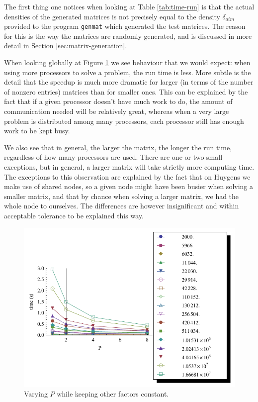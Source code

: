 \documentclass[a4paper]{article}
\newcommand{\legendplotsize}{1.3\textwidth}
\begin{document}
The first thing one notices when looking at Table \ref{tab:time-run} is that the actual densities of
the generated matrices is not precisely equal to the density $\delta_{aim}$ provided to the program
\texttt{genmat} which generated the test matrices. The reason for this is the way the matrices are
randomly generated, and is discussed in more detail in Section \ref{sec:matrix-generation}.

When looking globally at Figure \ref{fig:time-run} we see behaviour that we would expect: when
using more processors to solve a problem, the run time is less. More subtle is the detail that the
speedup is much more dramatic for larger (in terms of the number of nonzero entries) matrices than for smaller
ones. This can be explained by the fact that if a given processor doesn't have much work to do, the
amount of communication needed will be relatively great, whereas when a very large problem is distributed among
many processors, each processor still has enough work to be kept busy.

We also see that in general, the larger the matrix, the longer the run time, regardless of how many processors
are used. There are one or two small exceptions, but in general, a larger matrix will take strictly more computing
time. The exceptions to this observation are explained by the fact that on Huygens we make use of
shared nodes, so a given node might have been busier when solving a smaller matrix, and that by chance when
solving a larger matrix, we had the whole node to ourselves. The differences are however insignificant and
within acceptable tolerance to be explained this way.

\begin{figure}[h]
    \begin{center}
        \includegraphics[width=\legendplotsize]{img/time-run.pdf}
    \end{center}
    \caption{Varying $P$ while keeping other factors constant.}
    \label{fig:time-run}
\end{figure}
\end{document}
